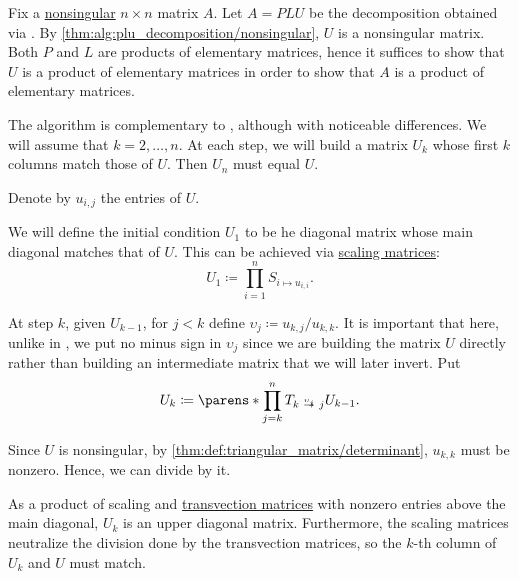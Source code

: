 \begin{algorithm}\label{alg:elementary_matrix_decomposition}
  Fix a \hyperref[def:inverse_matrix]{nonsingular} \( n \times n \) matrix \( A \). Let \( A = PLU \) be the decomposition obtained via . By \cref{thm:alg:plu_decomposition/nonsingular}, \( U \) is a nonsingular matrix. Both \( P \) and \( L \) are products of elementary matrices, hence it suffices to show that \( U \) is a product of elementary matrices in order to show that \( A \) is a product of elementary matrices.

  The algorithm is complementary to , although with noticeable differences. We will assume that \( k = 2, \ldots, n \). At each step, we will build a matrix \( U_k \) whose first \( k \) columns match those of \( U \). Then \( U_n \) must equal \( U \).

  Denote by \( u_{i,j} \) the entries of \( U \).

  \begin{thmenum}
     We will define the initial condition \( U_1 \) to be he diagonal matrix whose main diagonal matches that of \( U \). This can be achieved via \hyperref[def:elementary_matrix/scaling]{scaling matrices}:
    \begin{equation*}
      U_1 \coloneqq \prod_{i=1}^n S_{i \mapsto u_{i,i}}.
    \end{equation*}

     At step \( k \), given \( U_{k-1} \), for \( j < k \) define \( \upsilon_j \coloneqq u_{k,j} / u_{k,k} \). It is important that here, unlike in , we put no minus sign in \( \upsilon_j \) since we are building the matrix \( U \) directly rather than building an intermediate matrix that we will later invert. Put
    \begin{equation*}
      U_k \coloneqq \parens*{ \prod_{j=k}^n T_{k \reloset {\upsilon_j} \to j} } U_{k-1}.
    \end{equation*}

    Since \( U \) is nonsingular, by \cref{thm:def:triangular_matrix/determinant}, \( u_{k,k} \) must be nonzero. Hence, we can divide by it.

    As a product of scaling and \hyperref[def:elementary_matrix/transvection]{transvection matrices} with nonzero entries above the main diagonal, \( U_k \) is an upper diagonal matrix. Furthermore, the scaling matrices neutralize the division done by the transvection matrices, so the \( k \)-th column of \( U_k \) and \( U \) must match.
  \end{thmenum}
\end{algorithm}

